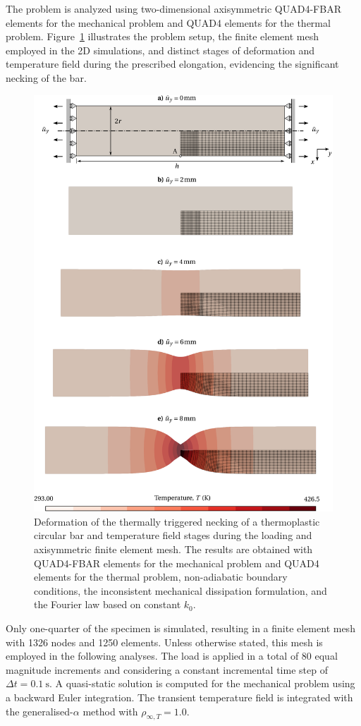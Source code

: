      The problem is analyzed using two-dimensional axisymmetric QUAD4-FBAR elements \citep{de_souza_neto_design_1996} for the mechanical problem and QUAD4 elements for the thermal problem.
     Figure~\ref{fig:necking} illustrates the problem setup, the finite element mesh employed in the 2D simulations, and distinct stages of deformation and temperature field during the prescribed elongation, evidencing the significant necking of the bar.
     \begin{figure}[p]
       \centering
       \includegraphics[width=0.9\linewidth]{figures/necking3.png}
       \caption{Deformation of the thermally triggered necking of a thermoplastic circular bar and temperature field stages during the loading and axisymmetric finite element mesh. The results are obtained with QUAD4-FBAR elements for the mechanical problem and QUAD4 elements for the thermal problem, non-adiabatic boundary conditions, the inconsistent mechanical dissipation formulation, and the Fourier law based on constant $k_{0}$.}
       \label{fig:necking}
     \end{figure}
     Only one-quarter of the specimen is simulated, resulting in a finite element mesh with 1326 nodes and 1250 elements.
     Unless otherwise stated, this mesh is employed in the following analyses.
     The load is applied in a total of 80 equal magnitude increments and considering a constant incremental time step of \(\Delta t = \SI{0.1}{\second}\).
     A quasi-static solution is computed for the mechanical problem using a backward Euler integration. The transient temperature field is integrated with the generalised-$\alpha$ method with $\rho_{\infty, T}=1.0$.


